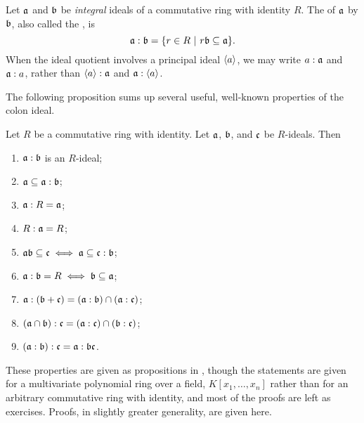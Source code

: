 Let $\frak a$ and $\frak b$ be \emph{integral} ideals of a commutative ring with identity $R$.
The  of $\frak a$ by $\frak b$, also called the , is
\[ \frak a : \frak b = \{ r \in R ~|~ r \frak b \subseteq \frak a \}. \]
When the ideal quotient involves a principal ideal $\left\langle a \right\rangle$, we may write $a : \frak a$ and $\frak a : a$,
rather than $\left\langle a \right\rangle : \frak a$ and $\frak a : \left\langle a \right\rangle$.

The following proposition sums up several useful, well-known properties of the colon ideal.
\begin{proposition}
  \label{prop_colon_ideal}
  Let $R$ be a commutative ring with identity.
  Let $\frak a$, $\frak b$, and $\frak c$ be $R$-ideals. Then
  \begin{enumerate}[label=(\roman*)]
    \item $\frak a : \frak b$ is an $R$-ideal;
    \item $\frak a \subseteq \frak a : \frak b$;
    \item $\frak a : R = \frak a$;
    \item $R : \frak a = R$;
    \item $\frak a \frak b \subseteq \frak c \iff \frak a \subseteq \frak c : \frak b$;
    \item $\frak a : \frak b = R \iff \frak b \subseteq \frak a$;
    \item $\frak a : (\frak b + \frak c) = (\frak a : \frak b) \cap (\frak a : \frak c)$;
    \item $(\frak a \cap \frak b) : \frak c = (\frak a : \frak c) \cap (\frak b : \frak c)$;
    \item $(\frak a : \frak b) : \frak c = \frak a : \frak b \frak c$.
  \end{enumerate}
\end{proposition}

These properties are given as propositions in \cite{cox07},
though the statements are given for a multivariate polynomial ring over a field, $K[x_1, \ldots, x_n]$
rather than for an arbitrary commutative ring with identity,
and most of the proofs are left as exercises.
Proofs, in slightly greater generality, are given here.

